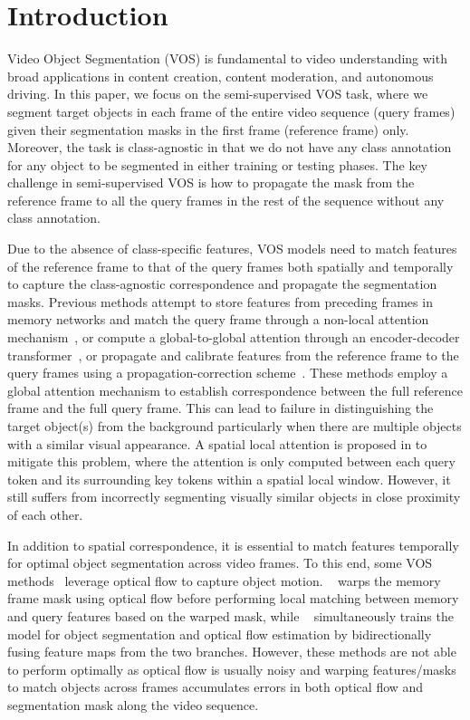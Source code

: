 \documentclass[runningheads]{llncs}
\begin{document}
\section{Introduction}
Video Object Segmentation (VOS) is fundamental to video understanding with broad applications in content creation, content moderation, and autonomous driving. In this paper, we focus on the semi-supervised VOS task, where we segment target objects in each frame of the entire video sequence (query frames) given their segmentation masks in the first frame (reference frame) only. Moreover, the task is class-agnostic in that we do not have any class annotation for any object to be segmented in either training or testing phases. The key challenge in semi-supervised VOS is how to propagate the mask from the reference frame to all the query frames in the rest of the sequence without any class annotation. 


Due to the absence of class-specific features, VOS models need to match features of the reference frame to that of the query frames both spatially and temporally to capture the class-agnostic correspondence and propagate the segmentation masks. Previous methods attempt to store features from preceding frames in memory networks and match the query frame through a non-local attention mechanism~\cite{STM,STCN}, or compute a global-to-global attention through an encoder-decoder transformer~\cite{TransVOS}, or propagate and calibrate features from the reference frame to the query frames using a propagation-correction scheme~\cite{RPCMVOS}. These methods employ a global attention mechanism to establish correspondence between the full reference frame and the full query frame. This can lead to failure in distinguishing the target object(s) from the background particularly when there are multiple objects with a similar visual appearance. 
A spatial local attention is proposed in \cite{AOT} to mitigate this problem, where the attention is only computed between each query token and its surrounding key tokens within a spatial local window. However, it still suffers from incorrectly segmenting visually similar objects in close proximity of each other.
 



In addition to spatial correspondence, it is essential to match features temporally for optimal object segmentation across video frames.
To this end, some VOS methods~\cite{RMNet,SegFlow} leverage optical flow to capture object motion. ~\cite{RMNet} warps the memory frame mask using optical flow before performing local matching between memory and query features based on the warped mask, while ~\cite{SegFlow} simultaneously trains the model for object segmentation and optical flow estimation by bidirectionally fusing feature maps from the two branches. However, these methods are not able to perform optimally as optical flow is usually noisy and warping features/masks to match objects across frames accumulates errors in both optical flow and segmentation mask along the video sequence.
\end{document}
